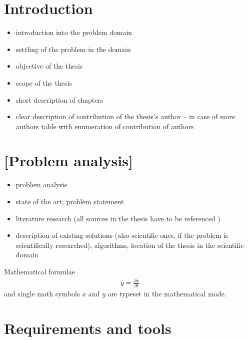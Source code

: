 \documentclass[a4paper,twoside,12pt]{book}
\begin{document}
\cleardoublepage

\pagestyle{PageNumbersChapterTitles}


\chapter{Introduction}

\begin{itemize}
\item introduction into the problem domain
\item settling of the problem in the domain
\item objective of the thesis 
\item scope of the thesis
\item short description of chapters
\item clear description of contribution of the thesis's author – in case of more authors table with enumeration of contribution of authors
\end{itemize}


\chapter{[Problem analysis]}

\begin{itemize}
\item  problem analysis
\item state of the art, problem statement
\item  literature research (all sources in the thesis have to be referenced \cite{bib:article,bib:book,bib:conference,bib:internet})
\item description of existing solutions (also scientific ones, if the problem is scientifically researched), algorithms,  location of the thesis in the scientific domain
\end{itemize}



Mathematical formulae  
\begin{align}
y = \frac{\partial x}{\partial t}
\end{align}
and single math symbols $x$ and $y$ are typeset in the mathematical mode.



\chapter{Requirements and tools}
\end{document}
